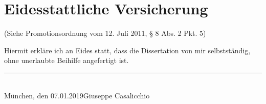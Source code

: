 \documentclass[bibliography=totoc,11pt,BCOR=12mm,DIV=14,twoside,parskip=half,paper=A4,pagesize=auto]{scrbook}\usepackage[]{graphicx}\usepackage{xcolor}
\newcommand{\deadline}{07.01.2019}
\begin{document}
\renewcommand\bibname{\protect Further References}




\chapter*{Eidesstattliche Versicherung}
\thispagestyle{empty}
\vspace{-1cm}
(Siehe Promotionsordnung vom 12. Juli 2011, § 8 Abs. 2 Pkt. 5)

\vspace{2cm} Hiermit erkläre ich an Eides statt, dass die Dissertation von mir selbstständig, \\
ohne unerlaubte Beihilfe angefertigt ist.

\vspace{3cm}
\hfill\rule{6cm}{0.4pt}\\
\noindent München, den \deadline \hfill Giuseppe Casalicchio
\cleardoublepage
\end{document}
